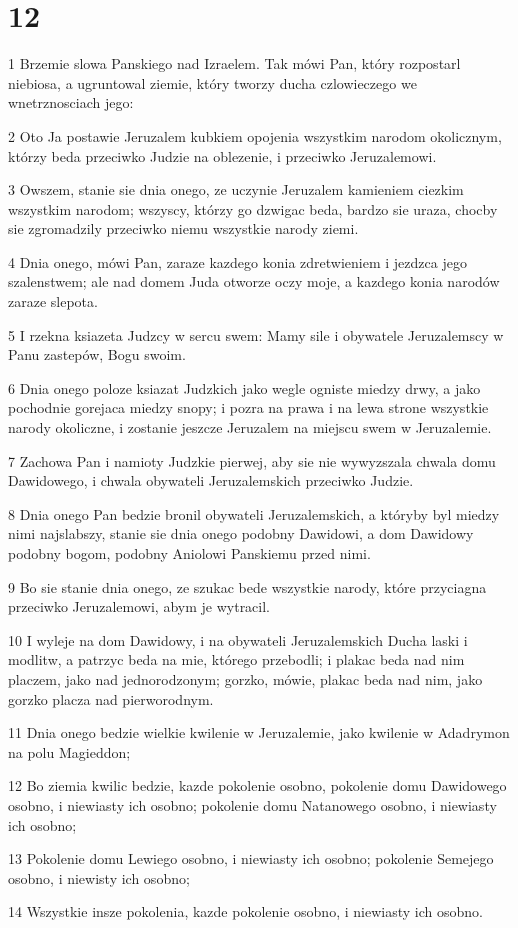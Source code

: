 \chapter{12}

\par 1 Brzemie slowa Panskiego nad Izraelem. Tak mówi Pan, który rozpostarl niebiosa, a ugruntowal ziemie, który tworzy ducha czlowieczego we wnetrznosciach jego:
\par 2 Oto Ja postawie Jeruzalem kubkiem opojenia wszystkim narodom okolicznym, którzy beda przeciwko Judzie na oblezenie, i przeciwko Jeruzalemowi.
\par 3 Owszem, stanie sie dnia onego, ze uczynie Jeruzalem kamieniem ciezkim wszystkim narodom; wszyscy, którzy go dzwigac beda, bardzo sie uraza, chocby sie zgromadzily przeciwko niemu wszystkie narody ziemi.
\par 4 Dnia onego, mówi Pan, zaraze kazdego konia zdretwieniem i jezdzca jego szalenstwem; ale nad domem Juda otworze oczy moje, a kazdego konia narodów zaraze slepota.
\par 5 I rzekna ksiazeta Judzcy w sercu swem: Mamy sile i obywatele Jeruzalemscy w Panu zastepów, Bogu swoim.
\par 6 Dnia onego poloze ksiazat Judzkich jako wegle ogniste miedzy drwy, a jako pochodnie gorejaca miedzy snopy; i pozra na prawa i na lewa strone wszystkie narody okoliczne, i zostanie jeszcze Jeruzalem na miejscu swem w Jeruzalemie.
\par 7 Zachowa Pan i namioty Judzkie pierwej, aby sie nie wywyzszala chwala domu Dawidowego, i chwala obywateli Jeruzalemskich przeciwko Judzie.
\par 8 Dnia onego Pan bedzie bronil obywateli Jeruzalemskich, a któryby byl miedzy nimi najslabszy, stanie sie dnia onego podobny Dawidowi, a dom Dawidowy podobny bogom, podobny Aniolowi Panskiemu przed nimi.
\par 9 Bo sie stanie dnia onego, ze szukac bede wszystkie narody, które przyciagna przeciwko Jeruzalemowi, abym je wytracil.
\par 10 I wyleje na dom Dawidowy, i na obywateli Jeruzalemskich Ducha laski i modlitw, a patrzyc beda na mie, którego przebodli; i plakac beda nad nim placzem, jako nad jednorodzonym; gorzko, mówie, plakac beda nad nim, jako gorzko placza nad pierworodnym.
\par 11 Dnia onego bedzie wielkie kwilenie w Jeruzalemie, jako kwilenie w Adadrymon na polu Magieddon;
\par 12 Bo ziemia kwilic bedzie, kazde pokolenie osobno, pokolenie domu Dawidowego osobno, i niewiasty ich osobno; pokolenie domu Natanowego osobno, i niewiasty ich osobno;
\par 13 Pokolenie domu Lewiego osobno, i niewiasty ich osobno; pokolenie Semejego osobno, i niewisty ich osobno;
\par 14 Wszystkie insze pokolenia, kazde pokolenie osobno, i niewiasty ich osobno.

